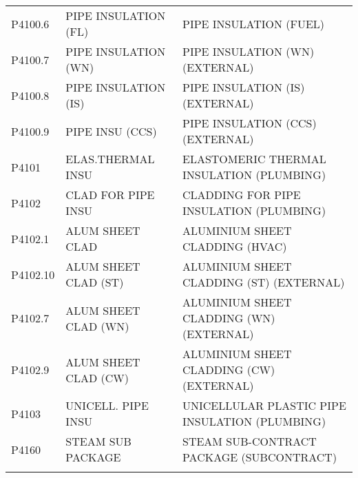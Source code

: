 \begin{longtable}[l]{l%
                  l|%
                  l|}
\rowcolor{thetableheadbgcolor!0.25!white} P4100.6     & PIPE INSULATION (FL)   & PIPE INSULATION (FUEL)   \\
\rowcolor{thetableheadbgcolor!0.25!white} P4100.7     & PIPE INSULATION (WN)   & PIPE INSULATION (WN) (EXTERNAL)   \\
\rowcolor{thetableheadbgcolor!0.25!white} P4100.8     & PIPE INSULATION (IS)   & PIPE INSULATION (IS) (EXTERNAL)   \\
\rowcolor{thetableheadbgcolor!0.25!white} P4100.9     & PIPE INSU (CCS)   & PIPE INSULATION (CCS) (EXTERNAL)   \\
\rowcolor{thetableheadbgcolor!0.25!white} P4101       & ELAS.THERMAL INSU   & ELASTOMERIC THERMAL INSULATION (PLUMBING)   \\
\rowcolor{thetableheadbgcolor!0.25!white} P4102       & CLAD FOR PIPE INSU   & CLADDING FOR PIPE INSULATION (PLUMBING)   \\
\rowcolor{thetableheadbgcolor!0.25!white} P4102.1     & ALUM SHEET CLAD   & ALUMINIUM SHEET CLADDING (HVAC)   \\
\rowcolor{thetableheadbgcolor!0.25!white} P4102.10    & ALUM SHEET CLAD (ST)   & ALUMINIUM SHEET CLADDING (ST) (EXTERNAL)   \\
\rowcolor{thetableheadbgcolor!0.25!white} P4102.7     & ALUM SHEET CLAD (WN)   & ALUMINIUM SHEET CLADDING (WN) (EXTERNAL)   \\
\rowcolor{thetableheadbgcolor!0.25!white} P4102.9     & ALUM SHEET CLAD (CW)   & ALUMINIUM SHEET CLADDING (CW) (EXTERNAL)   \\
\rowcolor{thetableheadbgcolor!0.25!white} P4103       & UNICELL. PIPE INSU   & UNICELLULAR PLASTIC PIPE INSULATION (PLUMBING)   \\
\rowcolor{thetableheadbgcolor!0.25!white} P4160       & STEAM SUB PACKAGE   & STEAM SUB-CONTRACT PACKAGE (SUBCONTRACT)   \\
\addlinespace[0pt] 
\bottomrule
\end{longtable}
\egroup
